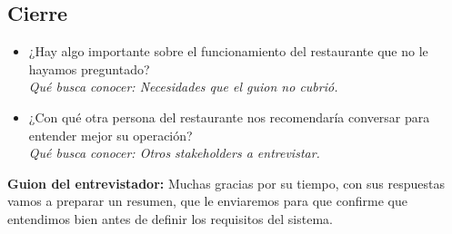 \subsection{Cierre}
\begin{itemize}
\item[\textbf{P13.}] ¿Hay algo importante sobre el funcionamiento del restaurante que no le hayamos preguntado?\\
\emph{Qué busca conocer: Necesidades que el guion no cubrió.}
\item[\textbf{P14.}] ¿Con qué otra persona del restaurante nos recomendaría conversar para entender mejor su operación?\\
\emph{Qué busca conocer: Otros stakeholders a entrevistar.}
\end{itemize}

\textbf{Guion del entrevistador:} Muchas gracias por su tiempo, con sus respuestas vamos a preparar un resumen, que le enviaremos para que confirme que entendimos bien antes de definir los requisitos del sistema.
